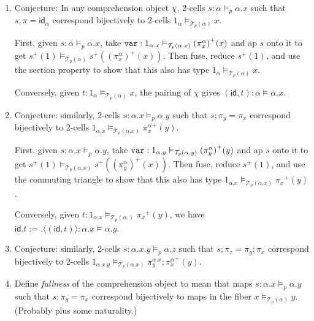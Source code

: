 \documentclass[10pt]{article}
\theoremstyle{definition}
\newcommand{\id}{\mathsf{id}}
\newcommand\TrPlus[2]{\ensuremath{{#1}^+(#2)}}
\newcommand\El[2]{\mathcal{T}_{#1}(#2)}
\newcommand\ap[2]{\ensuremath{#1 \langle #2 \rangle }}
\begin{document}
\begin{enumerate}

\item \label{sigma:total-to-fiber0} Conjecture: In any comprehension
  object $\chi$, 2-cells $s : \alpha \vDash_p \alpha.x$ such that $s;\pi
  = \id_\alpha$ correspond bijectively to 2-cells $1_\alpha
  \vDash_{\El{p}{\alpha}} x$.

  First, given $s : \alpha \vDash_p \alpha.x$, take $\mtt{var} : 1_{\alpha.x}
  \vDash_{\El{p}{\alpha.x}} \TrPlus{(\pi^\alpha_x)}{x}$ and ap $s$ onto
  it to get $\TrPlus{s}{1} \vDash_{\El{p}{\alpha}}
  \TrPlus{s}{\TrPlus{(\pi^\alpha_x)}{x}}$.  Then fuse, reduce
  $\TrPlus{s}{1}$, and use the section property to show that this also
  has type
  $1_\alpha \vDash_{\El{p}{\alpha}} x$.

  Conversely, given $t : 1_\alpha \vDash_{\El{p}{\alpha}} x$,
  the pairing of $\chi$ gives $(\id, t) : \alpha \vDash \alpha.x$.

\item \label{sigma:total-to-fiber1} Conjecture: similarly, 2-cells $s :
  \alpha.x \vDash_p \alpha.y$ such that $s;\pi_y = \pi_x$ correspond
  bijectively to 2-cells $1_{\alpha.x} \vDash_{\El{p}{\alpha.x}}
  \TrPlus{\pi^\alpha_x}{y}$.

  First, given $s : \alpha.x \vDash_p \alpha.y$, take $\mtt{var} :
  1_{\alpha.y} \vDash_{\El{p}{\alpha.y}} \TrPlus{(\pi^\alpha_y)}{y}$ and
  ap $s$ onto it to get $\TrPlus{s}{1} \vDash_{\El{p}{\alpha.x}}
  \TrPlus{s}{\TrPlus{(\pi^\alpha_y)}{x}}$.  Then fuse, reduce
  $\TrPlus{s}{1}$, and use the commuting triangle to show that this also
  has type $1_{\alpha.x} \vDash_{\El{p}{\alpha.x}} \TrPlus{\pi_x} y$.

  Conversely, given $t : 1_{\alpha.x} \vDash_{\El{p}{\alpha.}}
  \TrPlus{\pi_x} y$, we have $\id.t := \ap{.}{(\id, t)} : \alpha.x \vDash \alpha.y$.

\item \label{sigma:total-to-fiber2} Conjecture: similarly, 2-cells $s :
  \alpha.x.y \vDash_p \alpha.z$ such that $s;\pi_z = \pi_y;\pi_x$
  correspond bijectively to 2-cells $1_{\alpha.x.y}
  \vDash_{\El{p}{\alpha.x}} \TrPlus{\pi^{\alpha.x}_y;\pi^\alpha_x}{y}$.

\item \label{sigma:full} Define \emph{fullness} of the comprehension
  object to mean that maps $s : \alpha.x \vDash_p \alpha.y$ such that
  $s;\pi_y = \pi_x$ correspond bijectively to maps in the fiber $x
  \vDash_{\El{p}{\alpha}} y$.  (Probably plus some naturality.)


\end{enumerate}
\end{document}
